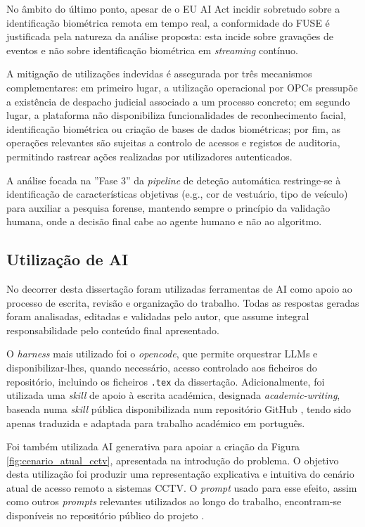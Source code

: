 No âmbito do último ponto, apesar de o EU AI Act incidir sobretudo sobre a identificação biométrica remota em tempo real, a conformidade do \gls{FUSE} é justificada pela natureza da análise proposta: esta incide sobre gravações de eventos e não sobre identificação biométrica em \textit{streaming} contínuo.

A mitigação de utilizações indevidas é assegurada por três mecanismos complementares: em primeiro lugar, a utilização operacional por \glspl{OPC} pressupõe a existência de despacho judicial associado a um processo concreto; em segundo lugar, a plataforma não disponibiliza funcionalidades de reconhecimento facial, identificação biométrica ou criação de bases de dados biométricas; por fim, as operações relevantes são sujeitas a controlo de acessos e registos de auditoria, permitindo rastrear ações realizadas por utilizadores autenticados.

A análise focada na ''Fase 3'' da \textit{pipeline} de deteção automática restringe-se à identificação de características objetivas (e.g., cor de vestuário, tipo de veículo) para auxiliar a pesquisa forense, mantendo sempre o princípio da validação humana, onde a decisão final cabe ao agente humano e não ao algoritmo.



\subsection{Utilização de \gls{AI}}
\label{subsec:utilizacao_ai}

No decorrer desta dissertação foram utilizadas ferramentas de \gls{AI} como apoio ao processo de escrita, revisão e organização do trabalho. Todas as respostas geradas foram analisadas, editadas e validadas pelo autor, que assume integral responsabilidade pelo conteúdo final apresentado.

O \textit{harness} mais utilizado foi o \textit{opencode}, que permite orquestrar \glspl{LLM} e disponibilizar-lhes, quando necessário, acesso controlado aos ficheiros do repositório, incluindo os ficheiros \texttt{.tex} da dissertação. Adicionalmente, foi utilizada uma \textit{skill} de apoio à escrita académica, designada \textit{academic-writing}, baseada numa \textit{skill} pública disponibilizada num repositório GitHub \cite{JamditisAcademicWritingSkill}, tendo sido apenas traduzida e adaptada para trabalho académico em português.

Foi também utilizada \gls{AI} generativa para apoiar a criação da Figura \ref{fig:cenario_atual_cctv}, apresentada na introdução do problema. O objetivo desta utilização foi produzir uma representação explicativa e intuitiva do cenário atual de acesso remoto a sistemas \gls{CCTV}. O \textit{prompt} usado para esse efeito, assim como outros \textit{prompts} relevantes utilizados ao longo do trabalho, encontram-se disponíveis no repositório público do projeto \cite{CaianoFUSEPrompts2026}.


